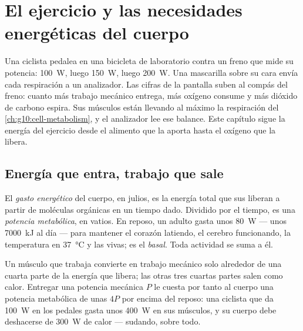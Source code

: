 \chapter{El ejercicio y las necesidades energéticas del cuerpo}\label{ch:g10:exercise-and-energy}

Una ciclista pedalea en una bicicleta de laboratorio contra un freno
que mide su potencia: \qty{100}{W}, luego \qty{150}{W}, luego
\qty{200}{W}. Una mascarilla sobre su cara envía cada respiración a un
analizador. Las cifras de la pantalla suben al compás del freno: cuanto
más trabajo mecánico entrega, más oxígeno consume y más dióxido de
carbono espira. Sus músculos están llevando al máximo la respiración
del \cref{ch:g10:cell-metabolism}, y el analizador lee ese balance.
Este capítulo sigue la energía del ejercicio desde el alimento que la
aporta hasta el oxígeno que la libera.

\section{Energía que entra, trabajo que sale}

\begin{definition}\label{def:g10:exercise-and-energy:expenditure}
El \emph{gasto energético} del cuerpo, en
julios, es la energía total que sus  liberan a partir de
moléculas orgánicas en un tiempo dado. Dividido por el tiempo, es una
\emph{potencia metabólica}, en vatios. En reposo, un adulto gasta unos
\qty{80}{W} --- unos \qty{7000}{kJ} al día --- para mantener el corazón
latiendo, el cerebro funcionando, la temperatura en \qty{37}{\celsius}
y las  vivas; es el \emph{ basal}. Toda actividad se
suma a él.
\end{definition}

\begin{proposition}\label{prop:g10:exercise-and-energy:efficiency}
Un músculo que trabaja convierte en trabajo mecánico solo alrededor de
una cuarta parte de la energía que libera; las otras tres cuartas
partes salen como calor. Entregar una potencia mecánica $P$ le cuesta
por tanto al cuerpo una potencia metabólica de unas $4P$ por encima del
reposo: una ciclista que da \qty{100}{W} en los pedales gasta unos
\qty{400}{W} en sus músculos, y su cuerpo debe deshacerse de
\qty{300}{W} de calor --- sudando, sobre todo.
\end{proposition}
\admitted

